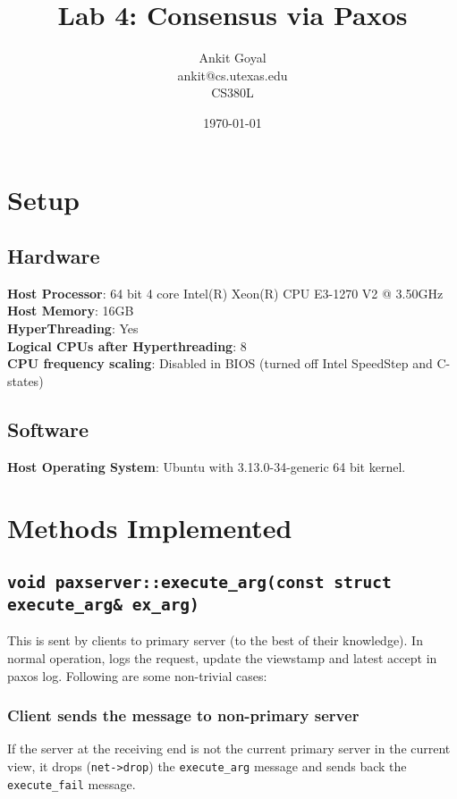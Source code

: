 \documentclass[10pt] {article}
\author{Ankit Goyal \\ankit@cs.utexas.edu \\ CS380L}
\title{Lab 4: Consensus via Paxos}
\date{\today}
\begin{document}
\maketitle

\section{Setup}
\subsection{Hardware}
\textbf{Host Processor}: 64 bit 4 core Intel(R) Xeon(R) CPU E3-1270 V2 @ 3.50GHz\\
\textbf{Host Memory}: 16GB \\
\textbf{HyperThreading}: Yes \\
\textbf{Logical CPUs after Hyperthreading}: 8 \\
\textbf{CPU frequency scaling}: Disabled in BIOS (turned off Intel SpeedStep and C-states)

\subsection{Software}
\textbf{Host Operating System}: Ubuntu with 3.13.0-34-generic 64 bit kernel.\\


\section {Methods Implemented}
\subsection {\texttt{void paxserver::execute\_arg(const struct execute\_arg\& ex\_arg)}}
This is sent by clients to primary server (to the best of their knowledge). In normal operation, logs the request, update the viewstamp and latest accept in paxos log. Following are some non-trivial cases:
\subsubsection {Client sends the message to non-primary server}
If the server at the receiving end is not the current primary server in the current view, it drops (\texttt{net->drop}) the \texttt{execute\_arg} message and sends back the \texttt{execute\_fail} message.
\end{document}
